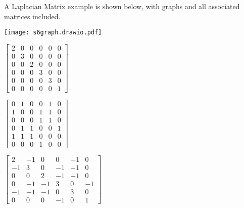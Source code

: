 \documentclass{article}
\begin{document}
\bigskip 

\noindent A Laplacian Matrix example is shown below, with graphs and all associated matrices included.

\bigskip 

\noindent\begin{minipage}{.5\textwidth}
\centering
\texttt{[image: s6graph.drawio.pdf]}
\label{fig:fig9}            
\end{minipage}%
\begin{minipage}{.5\textwidth}
\centering
\vspace{0.5cm}
$\begin{bmatrix}
2 & 0 & 0 & 0 & 0 & 0\\
0 & 3 & 0 & 0 & 0 & 0\\
0 & 0 & 2 & 0 & 0 & 0\\
0 & 0 & 0 & 3 & 0 & 0\\
0 & 0 & 0 & 0 & 3 & 0\\
0 & 0 & 0 & 0 & 0 & 1
\end{bmatrix}$
\vspace{0.5cm}

\label{fig:fig10}            
\end{minipage}

\bigskip 

\noindent\begin{minipage}{.5\textwidth}
\centering
\vspace{0.5cm}
$\begin{bmatrix}
0 & 1 & 0 & 0 & 1 & 0\\
1 & 0 & 0 & 1 & 1 & 0\\
0 & 0 & 0 & 1 & 1 & 0\\
0 & 1 & 1 & 0 & 0 & 1\\
1 & 1 & 1 & 0 & 0 & 0\\
0 & 0 & 0 & 1 & 0 & 0
\end{bmatrix}$
\vspace{0.5cm}
\label{fig:fig13}            
\end{minipage}%
\begin{minipage}{.5\textwidth}
\centering
\vspace{0.5cm}
$\begin{bmatrix}
2 & -1 & 0 & 0 & -1 & 0\\
-1 & 3 & 0 & -1 & -1 & 0\\
0 & 0 & 2 & -1 & -1 & 0\\
0 & -1 & -1 & 3 & 0 & -1\\
-1 & -1 & -1 & 0 & 3 & 0\\
0 & 0 & 0 & -1 & 0 & 1
\end{bmatrix}$
\vspace{0.5cm}

\label{fig:fig114}            
\end{minipage}
\end{document}

